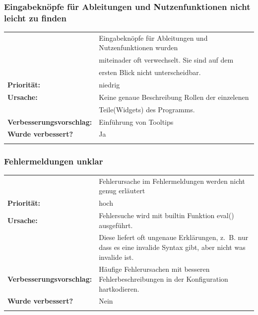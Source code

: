 \documentclass{article}
\begin{document}
\subsubsection*{Eingabeknöpfe für Ableitungen und Nutzenfunktionen nicht leicht zu finden}
\begin{tabular}{ll}
\begin{tabularx}{\textwidth}{rX}
    \textbf{Beschreibung:} & Eingabeknöpfe für Ableitungen und Nutzenfunktionen wurden  \\
    &miteinader oft verwechselt. Sie sind auf dem \\
    & ersten Blick nicht unterscheidbar. \\
    \textbf{Priorität:} & niedrig\\
    \textbf{Ursache:} & Keine genaue Beschreibung Rollen der einzelenen \\
    & Teile(Widgets) des Programms.\\
    \textbf{Verbesserungsvorschlag:} & Einführung von Tooltips \\
    \textbf{Wurde verbessert?} & Ja\\
    \end{tabularx}
\end{tabular}

\subsubsection*{Fehlermeldungen unklar}
\begin{tabular}{ll}
\begin{tabularx}{\textwidth}{rX}
    \textbf{Beschreibung:} & Fehlerursache im Fehlermeldungen werden nicht genug erläutert  \\
    \textbf{Priorität:} & hoch\\
    \textbf{Ursache:} & Fehlersuche wird mit builtin Funktion eval() ausgeführt. \\
    & Diese liefert oft ungenaue Erklärungen, z.~B. nur dass es eine invalide Syntax gibt, aber nicht was invalide ist.\\
    \textbf{Verbesserungsvorschlag:} & Häufige Fehlerursachen mit besseren Fehlerbeschreibungen in der Konfiguration hartkodieren. \\
    \textbf{Wurde verbessert?} & Nein\\
\end{tabularx}
\end{tabular}
\end{document}
